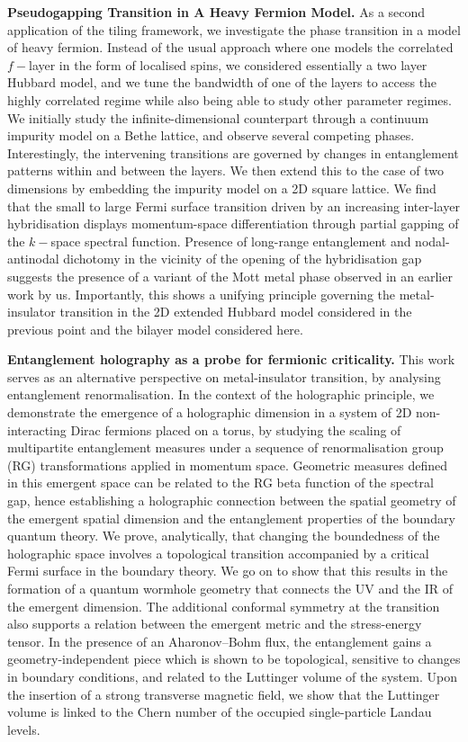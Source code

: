 \vspace{1em}
{\bf Pseudogapping Transition in A Heavy Fermion Model.} As a second application of the tiling framework, we investigate the phase transition in a model of heavy fermion. Instead of the usual approach where one models the correlated \(f-\)layer in the form of localised spins, we considered essentially a two layer Hubbard model, and we tune the bandwidth of one of the layers to access the highly correlated regime while also being able to study other parameter regimes. We initially study the infinite-dimensional counterpart through a continuum impurity model on a Bethe lattice, and observe several competing phases. Interestingly, the intervening transitions are governed by changes in entanglement patterns within and between the layers. We then extend this to the case of two dimensions by embedding the impurity model on a 2D square lattice. We find that the small to large Fermi surface transition driven by an increasing inter-layer hybridisation displays momentum-space differentiation through partial gapping of the \(k-\)space spectral function. Presence of long-range entanglement and nodal-antinodal dichotomy in the vicinity of the opening of the hybridisation gap suggests the presence of a variant of the Mott metal phase observed in an earlier work by us. Importantly, this shows a unifying principle governing the metal-insulator transition in the 2D extended Hubbard model considered in the previous point and the bilayer model considered here.

{\bf Entanglement holography as a probe for fermionic criticality.} This work serves as an alternative perspective on metal-insulator transition, by analysing entanglement renormalisation. In the context of the holographic principle, we demonstrate the emergence of a holographic dimension in a system of 2D non-interacting Dirac fermions placed on a torus, by studying the scaling of multipartite entanglement measures under a sequence of renormalisation group (RG) transformations applied in momentum space. Geometric measures defined in this emergent space can be related to the RG beta function of the spectral gap, hence establishing a holographic connection between the spatial geometry of the emergent spatial dimension and the entanglement properties of the boundary quantum theory. We prove, analytically, that changing the boundedness of the holographic space involves a topological transition accompanied by a critical Fermi surface in the boundary theory. We go on to show that this results in the formation of a quantum wormhole geometry that connects the UV and the IR of the emergent dimension. The additional conformal symmetry at the transition also supports a relation between the emergent metric and the stress-energy tensor. In the presence of an Aharonov–Bohm flux, the entanglement gains a geometry-independent piece which is shown to be topological, sensitive to changes in boundary conditions, and related to the Luttinger volume of the system. Upon the insertion of a strong transverse magnetic field, we show that the Luttinger volume is linked to the Chern number of the occupied single-particle Landau levels.
